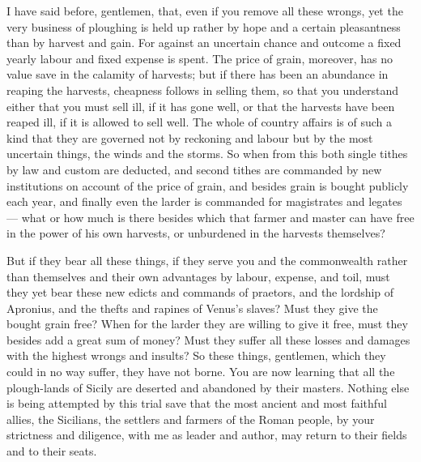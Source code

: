  I have said before, gentlemen, that, even if you remove all these wrongs, yet the very business of ploughing is held up rather by hope and a certain pleasantness than by harvest and gain. For against an uncertain chance and outcome a fixed yearly labour and fixed expense is spent. The price of grain, moreover, has no value save in the calamity of harvests; but if there has been an abundance in reaping the harvests, cheapness follows in selling them, so that you understand either that you must sell ill, if it has gone well, or that the harvests have been reaped ill, if it is allowed to sell well. The whole of country affairs is of such a kind that they are governed not by reckoning and labour but by the most uncertain things, the winds and the storms. So when from this both single tithes by law and custom are deducted, and second tithes are commanded by new institutions on account of the price of grain, and besides grain is bought publicly each year, and finally even the larder is commanded for magistrates and legates --- what or how much is there besides which that farmer and master can have free in the power of his own harvests, or unburdened in the harvests themselves?

 But if they bear all these things, if they serve you and the commonwealth rather than themselves and their own advantages by labour, expense, and toil, must they yet bear these new edicts and commands of praetors, and the lordship of Apronius, and the thefts and rapines of Venus's slaves? Must they give the bought grain free? When for the larder they are willing to give it free, must they besides add a great sum of money? Must they suffer all these losses and damages with the highest wrongs and insults? So these things, gentlemen, which they could in no way suffer, they have not borne. You are now learning that all the plough-lands of Sicily are deserted and abandoned by their masters. Nothing else is being attempted by this trial save that the most ancient and most faithful allies, the Sicilians, the settlers and farmers of the Roman people, by your strictness and diligence, with me as leader and author, may return to their fields and to their seats.


